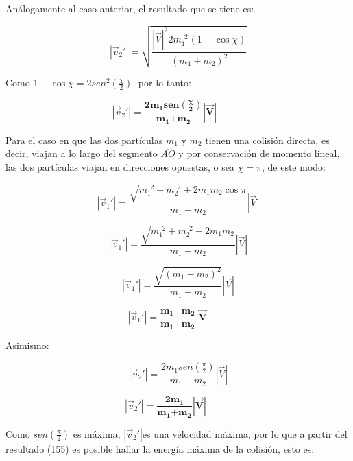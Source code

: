 \documentclass[]{article}
\begin{document}
Análogamente al caso anterior, el resultado que se tiene es:

\[\left| {\overrightarrow{v}}_{2}' \right| = \sqrt{\frac{{\left| \overrightarrow{V} \right|^{2}2m_{1}^{\ \ 2}}^{}\left( 1 - \cos\chi \right)}{\left( m_{1} + m_{2} \right)^{2}}}\]

Como \(1 - \cos\chi = 2{sen}^{2}\left( \frac{\chi}{2} \right)\), por lo
tanto:

\[\left| {\overrightarrow{v}}_{2}' \right|\mathbf{=}\frac{\mathbf{2}\mathbf{m}_{\mathbf{1}}\mathbf{sen}\left( \frac{\mathbf{\chi}}{\mathbf{2}} \right)}{\mathbf{m}_{\mathbf{1}}\mathbf{+}\mathbf{m}_{\mathbf{2}}}\left| \overrightarrow{\mathbf{V}} \right|\mathbf{\ \ \ \ \ \ \ \ \ \ \ \ \ }\]

Para el caso en que las dos partículas \(m_{1}\) y \(m_{2}\) tienen una
colisión directa, es decir, viajan a lo largo del segmento
\(\overline{AO}\) y por conservación de momento lineal, las dos
partículas viajan en direcciones opuestas, o sea \(\chi = \pi\), de este
modo:

\[\left| {\overrightarrow{v}}_{1}' \right| = \frac{\sqrt{m_{1}^{\ \ 2} + m_{2}^{\ \ 2} + 2m_{1}m_{2}\cos\pi}}{m_{1} + m_{2}}\left| \overrightarrow{V} \right|\]

\[\left| {\overrightarrow{v}}_{1}' \right| = \frac{\sqrt{m_{1}^{\ \ 2} + m_{2}^{\ \ 2} - 2m_{1}m_{2}}}{m_{1} + m_{2}}\left| \overrightarrow{V} \right|\]

\[\left| {\overrightarrow{v}}_{1}' \right| = \frac{\sqrt{\left( m_{1} - m_{2} \right)^{2}}}{m_{1} + m_{2}}\left| \overrightarrow{V} \right|\]

\[\left| {\overrightarrow{v}}_{1}' \right|\mathbf{=}\frac{\mathbf{m}_{\mathbf{1}}\mathbf{-}\mathbf{m}_{\mathbf{2}}}{\mathbf{m}_{\mathbf{1}}\mathbf{+}\mathbf{m}_{\mathbf{2}}}\left| \overrightarrow{\mathbf{V}} \right|\mathbf{\ \ \ \ \ \ \ \ \ }\]

Asimismo:

\[\left| {\overrightarrow{v}}_{2}' \right| = \frac{2m_{1}{sen}\left( \frac{\pi}{2} \right)}{m_{1} + m_{2}}\left| \overrightarrow{V} \right|\]

\[\left| {\overrightarrow{v}}_{2}' \right|\mathbf{=}\frac{\mathbf{2}\mathbf{m}_{\mathbf{1}}}{\mathbf{m}_{\mathbf{1}}\mathbf{+}\mathbf{m}_{\mathbf{2}}}\left| \overrightarrow{\mathbf{V}} \right|\mathbf{\ \ \ \ \ \ \ \ \ \ \ \ }\]

Como \({sen}\left( \frac{\pi}{2} \right)\) es máxima,
\(\left| {\overrightarrow{v}}_{2}' \right|\)es una velocidad máxima, por
lo que a partir del resultado (155) es posible hallar la energía máxima
de la colisión, esto es:
\end{document}
